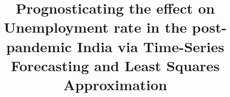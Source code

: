 \documentclass[10pt,journal,compsoc]{IEEEtran}
\begin{document}
%
\title{Prognosticating the effect on Unemployment rate in the post-pandemic India via Time-Series Forecasting and Least Squares Approximation}
%
%
%
%
\end{document}
